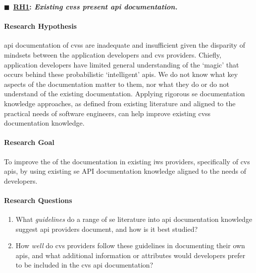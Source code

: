 \ifdefined\review\else\begin{titled-frame}\fi
{$\blacksquare$~\bfseries \underline{RH1}: \textit{Existing \glspl{cvs} present  \gls{api} documentation.}}
\label{rh1}
\vspace{-12pt}
\paragraph{Research Hypothesis}
\gls{api} documentation of \glspl{cvs} are inadequate and insufficient given the disparity of mindsets between the application developers and \gls{cvs} providers. Chiefly, application developers have limited general understanding of the `magic' that occurs behind these probabilistic `intelligent' \glspl{api}. We do not know what key aspects of the documentation matter to them, nor what they do or do not understand of the existing documentation. Applying rigorous \gls{se} documentation knowledge approaches, as defined from existing literature and aligned to the practical needs of software engineers, can help improve existing \glspl{cvs} documentation knowledge.

\paragraph{Research Goal}
To improve the  of the documentation in existing \gls{iws} providers, specifically of \gls{cvs} \glspl{api}, by using existing \gls{se} API documentation knowledge aligned to the needs of developers.

\paragraph{Research Questions}
\begin{enumerate}[label=\textbf{RQ1.\arabic*.}, ref=RQ1.\arabic*, leftmargin=3.5\parindent, rightmargin=1\parindent]
  \item What \textit{guidelines} do a range of \gls{se} literature into \gls{api} documentation knowledge suggest \gls{api} providers document, and how is it best studied? 
  \label{rqs:apidoc:what-is-in-use}%
  
  \item How \textit{well} do \gls{cvs} providers follow these guidelines in documenting their own \glspl{api}, and what additional information or attributes would developers prefer to be included in the \gls{cvs} \gls{api} documentation? 
  \label{rqs:apidoc:what-additional-information-needed}%
 

\end{enumerate}
\end{titled-frame}
